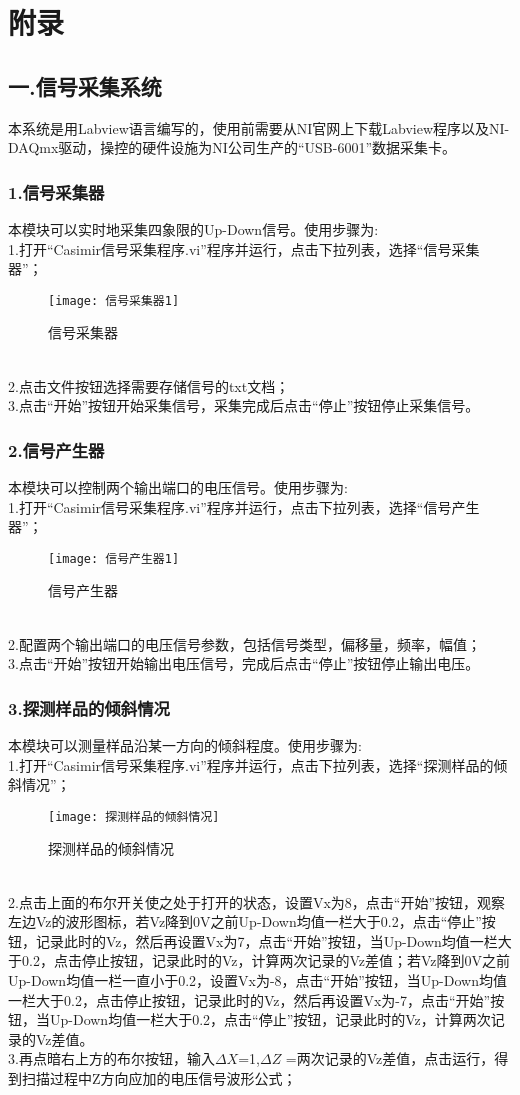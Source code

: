 
\chapter{附录}
\section*{一.信号采集系统}
本系统是用Labview语言编写的，使用前需要从NI官网上下载Labview程序以及NI-DAQmx驱动，操控的硬件设施为NI公司生产的“USB-6001”数据采集卡。
\subsection*{1.信号采集器}
本模块可以实时地采集四象限的Up-Down信号。使用步骤为:
\\1.打开“Casimir信号采集程序.vi”程序并运行，点击下拉列表，选择“信号采集器”；
\begin{figure}[h]
	\centering
	\texttt{[image: 信号采集器1]}
	\caption{信号采集器}
\end{figure}
\\2.点击文件按钮选择需要存储信号的txt文档；
\\3.点击“开始”按钮开始采集信号，采集完成后点击“停止”按钮停止采集信号。
\subsection*{2.信号产生器}
本模块可以控制两个输出端口的电压信号。使用步骤为:
\\1.打开“Casimir信号采集程序.vi”程序并运行，点击下拉列表，选择“信号产生器”；
\begin{figure}[h]
	\centering
	\texttt{[image: 信号产生器1]}
	\caption{信号产生器}
\end{figure}
\\2.配置两个输出端口的电压信号参数，包括信号类型，偏移量，频率，幅值；
\\3.点击“开始”按钮开始输出电压信号，完成后点击“停止”按钮停止输出电压。
\newpage
\subsection*{3.探测样品的倾斜情况}
本模块可以测量样品沿某一方向的倾斜程度。使用步骤为:
\\1.打开“Casimir信号采集程序.vi”程序并运行，点击下拉列表，选择“探测样品的倾斜情况”；
\begin{figure}[h]
	\centering
	\texttt{[image: 探测样品的倾斜情况]}
	\caption{探测样品的倾斜情况}
\end{figure}
\\2.点击上面的布尔开关使之处于打开的状态，设置Vx为8，点击“开始”按钮，观察左边Vz的波形图标，若Vz降到0V之前Up-Down均值一栏大于0.2，点击“停止”按钮，记录此时的Vz，然后再设置Vx为7，点击“开始”按钮，当Up-Down均值一栏大于0.2，点击停止按钮，记录此时的Vz，计算两次记录的Vz差值；若Vz降到0V之前Up-Down均值一栏一直小于0.2，设置Vx为-8，点击“开始”按钮，当Up-Down均值一栏大于0.2，点击停止按钮，记录此时的Vz，然后再设置Vx为-7，点击“开始”按钮，当Up-Down均值一栏大于0.2，点击“停止”按钮，记录此时的Vz，计算两次记录的Vz差值。
\\3.再点暗右上方的布尔按钮，输入$\Delta X$=1,$\Delta Z$ =两次记录的Vz差值，点击运行，得到扫描过程中Z方向应加的电压信号波形公式；
